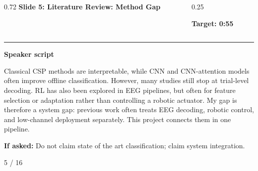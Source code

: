 \documentclass[aspectratio=169,10pt]{beamer}
\begin{document}
\begin{frame}[plain]
\vspace*{0.16cm}
\begin{columns}[T,totalwidth=\textwidth]
\begin{column}{0.72\textwidth}
{\fontsize{17}{18.5}\selectfont\bfseries Slide 5: Literature Review: Method Gap}
\end{column}
\begin{column}{0.25\textwidth}
\raggedleft
\colorbox{noteCream}{\parbox{0.88\linewidth}{\centering\bfseries Target: 0:55}}
\end{column}
\end{columns}
\vspace{0.10cm}
{\color{uomPurple}\rule{\textwidth}{1.2pt}}
\vspace{0.18cm}
{\color{uomPurple}\bfseries Speaker script}
\vspace{0.06cm}
\setlength{\fboxsep}{6pt}
\noindent\colorbox{panelGrey}{\begin{minipage}{0.94\textwidth}
\justifying\fontsize{11.0}{13.4}\selectfont
Classical CSP methods are interpretable, while CNN and CNN-attention models often improve offline classification. However, many studies still stop at trial-level decoding. RL has also been explored in EEG pipelines, but often for feature selection or adaptation rather than controlling a robotic actuator. My gap is therefore a system gap: previous work often treats EEG decoding, robotic control, and low-channel deployment separately. This project connects them in one pipeline.
\end{minipage}}
\vspace{0.22cm}
\noindent\colorbox{noteCream}{\begin{minipage}{0.94\textwidth}
\fontsize{9.6}{11.6}\selectfont
{\bfseries If asked:} Do not claim state of the art classification; claim system integration.
\end{minipage}}
\vfill
\hfill{\color{textDark}\scriptsize 5 / 16}
\end{frame}
\end{document}
